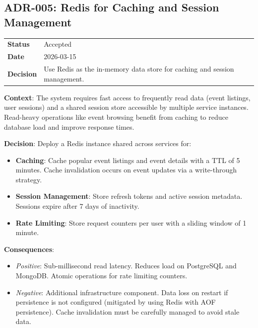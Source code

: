 \subsection{ADR-005: Redis for Caching and Session Management}

\begin{tabular}{p{3cm}p{10cm}}
\textbf{Status} & Accepted \\
\textbf{Date} & 2026-03-15 \\
\textbf{Decision} & Use Redis as the in-memory data store for caching and session management. \\
\end{tabular}

\textbf{Context}: The system requires fast access to frequently read data (event listings, user sessions) and a shared session store accessible by multiple service instances. Read-heavy operations like event browsing benefit from caching to reduce database load and improve response times.

\textbf{Decision}: Deploy a Redis instance shared across services for:
\begin{itemize}
    \item \textbf{Caching}: Cache popular event listings and event details with a TTL of 5 minutes. Cache invalidation occurs on event updates via a write-through strategy.
    \item \textbf{Session Management}: Store refresh tokens and active session metadata. Sessions expire after 7 days of inactivity.
    \item \textbf{Rate Limiting}: Store request counters per user with a sliding window of 1 minute.
\end{itemize}

\textbf{Consequences}:
\begin{itemize}
    \item \textit{Positive}: Sub-millisecond read latency. Reduces load on PostgreSQL and MongoDB. Atomic operations for rate limiting counters.
    \item \textit{Negative}: Additional infrastructure component. Data loss on restart if persistence is not configured (mitigated by using Redis with AOF persistence). Cache invalidation must be carefully managed to avoid stale data.
\end{itemize}

